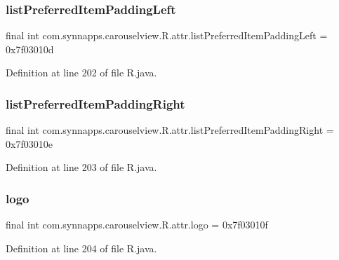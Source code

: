 \subsubsection{\texorpdfstring{listPreferredItemPaddingLeft}{listPreferredItemPaddingLeft}}
{\footnotesize\ttfamily final int com.\+synnapps.\+carouselview.\+R.\+attr.\+list\+Preferred\+Item\+Padding\+Left = 0x7f03010d\hspace{0.3cm}{\ttfamily [static]}}



Definition at line 202 of file R.\+java.

\mbox{\label{classcom_1_1synnapps_1_1carouselview_1_1_r_1_1attr_a1870846256cdd43a4c07abba59ebe009}} 
\subsubsection{\texorpdfstring{listPreferredItemPaddingRight}{listPreferredItemPaddingRight}}
{\footnotesize\ttfamily final int com.\+synnapps.\+carouselview.\+R.\+attr.\+list\+Preferred\+Item\+Padding\+Right = 0x7f03010e\hspace{0.3cm}{\ttfamily [static]}}



Definition at line 203 of file R.\+java.

\mbox{\label{classcom_1_1synnapps_1_1carouselview_1_1_r_1_1attr_a9244df2408aebd11c00c85015c917813}} 
\subsubsection{\texorpdfstring{logo}{logo}}
{\footnotesize\ttfamily final int com.\+synnapps.\+carouselview.\+R.\+attr.\+logo = 0x7f03010f\hspace{0.3cm}{\ttfamily [static]}}



Definition at line 204 of file R.\+java.


